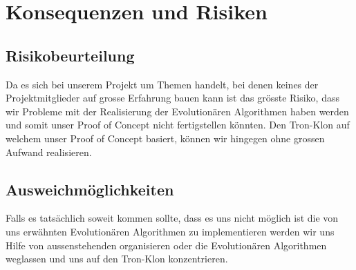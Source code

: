 \section{Konsequenzen und Risiken}
\subsection{Risikobeurteilung}
Da es sich bei unserem Projekt um Themen handelt, bei denen keines der Projektmitglieder auf grosse Erfahrung bauen kann ist das grösste Risiko, dass wir Probleme mit der Realisierung der Evolutionären Algorithmen haben werden und somit unser Proof of Concept nicht fertigstellen könnten. Den Tron-Klon auf welchem unser Proof of Concept basiert, können wir hingegen ohne grossen Aufwand realisieren.

\subsection{Ausweichmöglichkeiten}
Falls es tatsächlich soweit kommen sollte, dass es uns nicht möglich ist die von uns erwähnten Evolutionären Algorithmen zu implementieren werden wir uns Hilfe von aussenstehenden organisieren oder die Evolutionären Algorithmen weglassen und uns auf den Tron-Klon konzentrieren. 